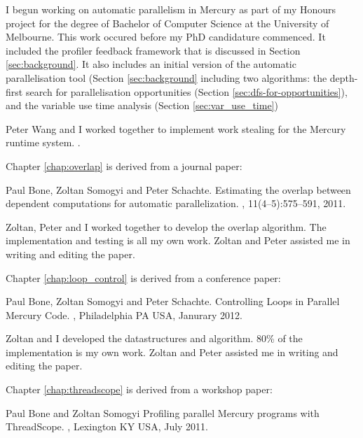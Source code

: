\documentclass[a4paper,twoside]{report}
\begin{document}
I begun working on automatic parallelism in Mercury as part of my Honours project
for the degree of Bachelor of Computer Science at the University of Melbourne.
This work occured before my PhD candidature commenced.
It included the profiler feedback framework that is discussed in Section
\ref{sec:background}.
It also includes an initial version of the automatic parallelisation tool
(Section \ref{sec:background}
including two algorithms:
the depth-first search for parallelisation opportunities
(Section \ref{sec:dfs-for-opportunities}),
and the variable use time analysis (Section \ref{sec:var_use_time})

Peter Wang and I worked together to implement work stealing for the Mercury
runtime system.
.

Chapter \ref{chap:overlap} is derived from a journal paper:

Paul Bone, Zoltan Somogyi and Peter Schachte.
\newblock Estimating the overlap between dependent computations for automatic
  parallelization.
, 11(4--5):575--591,
  2011.

Zoltan, Peter and I worked together to develop the overlap algorithm.
The implementation and testing is all my own work.
Zoltan and Peter assisted me in writing and editing the paper.

Chapter \ref{chap:loop_control} is derived from a conference paper:

Paul Bone, Zoltan Somogyi and Peter Schachte.
\newblock Controlling Loops in Parallel Mercury Code.
,
Philadelphia PA USA, Janurary 2012.

Zoltan and I developed the datastructures and algorithm.
80\% of the implementation is my own work.
Zoltan and Peter assisted me in writing and editing the paper.

Chapter \ref{chap:threadscope} is derived from a workshop paper:

Paul Bone and Zoltan Somogyi
\newblock Profiling parallel Mercury programs with ThreadScope.
,
Lexington KY USA, July 2011.
\end{document}
